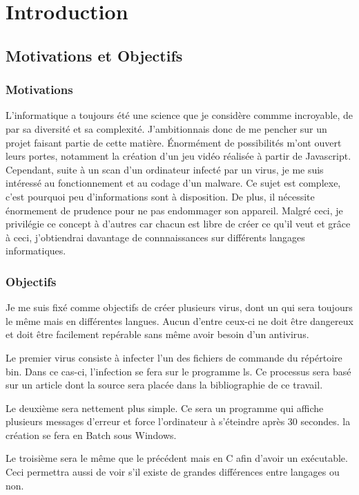 \chapter{Introduction}

\section{Motivations et Objectifs}

\subsection{Motivations}
	L'informatique a toujours été une science que je considère commme incroyable, de par sa diversité et sa complexité. J'ambitionnais donc de me pencher sur un projet faisant partie de cette matière. Énormément de possibilités m'ont ouvert leurs portes, notamment la création d'un jeu vidéo réalisée à partir de Javascript. Cependant, suite à un scan d'un ordinateur infecté par un virus, je me suis intéressé au fonctionnement et au codage d'un malware. Ce sujet est complexe, c'est pourquoi peu d'informations sont à disposition. De plus, il nécessite énormement de prudence pour ne pas endommager son appareil. Malgré ceci, je privilégie ce concept à d'autres car chacun est libre de créer ce qu'il veut et grâce à ceci, j'obtiendrai davantage de connnaissances sur différents langages informatiques.  
\subsection{Objectifs}
	Je me suis fixé comme objectifs de créer plusieurs virus, dont un qui sera toujours le même mais en différentes langues. Aucun d'entre ceux-ci ne doit être dangereux et doit être facilement repérable sans même avoir besoin d'un antivirus.

Le premier virus consiste à infecter l'un des fichiers de commande du répértoire bin. Dans ce cas-ci, l'infection se fera sur le programme ls. Ce processus sera basé sur un article dont la source sera placée dans la bibliographie de ce travail.


Le deuxième sera nettement plus simple. Ce sera un programme qui affiche plusieurs messages d'erreur et force l'ordinateur à s'éteindre après 30 secondes. la création se fera en Batch sous Windows.

Le troisième sera le même que le précédent mais en C afin d'avoir un exécutable. Ceci permettra aussi de voir s'il existe de grandes différences entre langages ou non.

